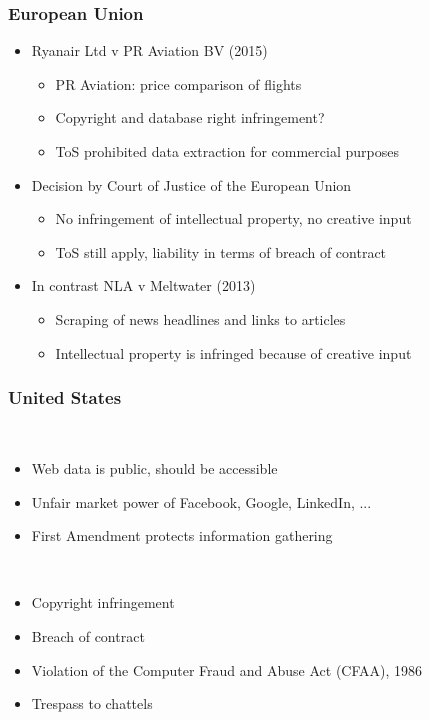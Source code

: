 \begin{frame}
    \frametitle{European Union}
    \begin{itemize}
        \item \textcolor{iseblue}{Ryanair Ltd v PR Aviation BV (2015)}
        \begin{itemize}
            \item PR Aviation: price comparison of flights
            \item Copyright and database right infringement?
            \item ToS prohibited data extraction for commercial purposes
        \end{itemize}
            \end{itemize}
        \begin{itemize}
        \item Decision by Court of Justice of the European Union
        \begin{itemize}
            \item No infringement of intellectual property, no creative input
            \item ToS still apply, liability in terms of breach of contract
        \end{itemize}
    \end{itemize}
    \vspace{5pt}
        \begin{itemize}
        \item In contrast \textcolor{iseblue}{NLA v Meltwater (2013)}
        \begin{itemize}
            \item Scraping of news headlines and links to articles
            \item Intellectual property is infringed because of creative input
        \end{itemize}
    \end{itemize}
\end{frame}

\begin{frame}
    \frametitle{United States}
 \\
\begin{itemize}
    \item Web data is public, should be accessible
    \item Unfair market power of Facebook, Google, LinkedIn, ...
    \item First Amendment protects information gathering
\end{itemize}
\vspace{8pt}
 \\
\begin{itemize}
    \item Copyright infringement
    \item Breach of contract
    \item Violation of the Computer Fraud and Abuse Act (CFAA), 1986
    \item Trespass to chattels
\end{itemize}
\end{frame}

